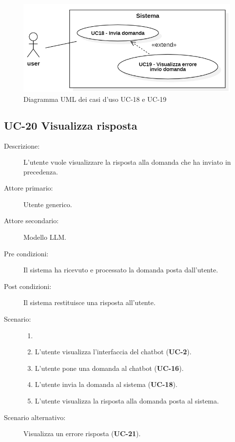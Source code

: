 \begin{figure}[H]
    \centering
    \includegraphics[width=\linewidth]{UC18-19.PNG}
    \caption{Diagramma UML dei casi d'uso UC-18 e UC-19}
    \label{fig:UC18-19}
\end{figure}

\subsection{UC-20 Visualizza risposta}
\begin{description}
    \item[Descrizione:] L'utente vuole visualizzare la risposta alla domanda che ha inviato in precedenza.
    \item[Attore primario:] Utente generico.
    \item[Attore secondario:] Modello LLM. 
    \item[Pre condizioni:] Il sistema ha ricevuto e processato la domanda posta dall'utente.
    \item[Post condizioni:] Il sistema restituisce una risposta all'utente.
    \item[Scenario:]
    \begin{enumerate}
        \item[] 
        \item L’utente visualizza l'interfaccia del chatbot (\textbf{UC-2}).
        \item L’utente pone una domanda al chatbot (\textbf{UC-16}).
        \item L'utente invia la domanda al sistema (\textbf{UC-18}).
        \item L'utente visualizza la risposta alla domanda posta al sistema.
    \end{enumerate}
    \item[Scenario alternativo:] Visualizza un errore risposta (\textbf{UC-21}).
\end{description}

